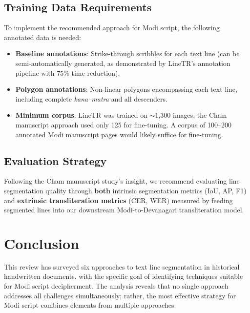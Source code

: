 \documentclass[11pt, a4paper]{article}
\begin{document}
\subsection{Training Data Requirements}

To implement the recommended approach for Modi script, the following annotated data is needed:
\begin{itemize}[leftmargin=1.5em]
    \item \textbf{Baseline annotations}: Strike-through scribbles for each text line (can be semi-automatically generated, as demonstrated by LineTR's annotation pipeline with 75\% time reduction).
    \item \textbf{Polygon annotations}: Non-linear polygons encompassing each text line, including complete \textit{kana--matra} and all descenders.
    \item \textbf{Minimum corpus}: LineTR was trained on $\sim$1,300 images; the Cham manuscript approach used only 125 for fine-tuning. A corpus of 100--200 annotated Modi manuscript pages would likely suffice for fine-tuning.
\end{itemize}

\subsection{Evaluation Strategy}

Following the Cham manuscript study's insight, we recommend evaluating line segmentation quality through \textbf{both} intrinsic segmentation metrics (IoU, AP, F1) and \textbf{extrinsic transliteration metrics} (CER, WER) measured by feeding segmented lines into our downstream Modi-to-Devanagari transliteration model.


\section{Conclusion}
\label{sec:conclusion}

This review has surveyed six approaches to text line segmentation in historical handwritten documents, with the specific goal of identifying techniques suitable for Modi script decipherment. The analysis reveals that no single approach addresses all challenges simultaneously; rather, the most effective strategy for Modi script combines elements from multiple approaches:
\end{document}
